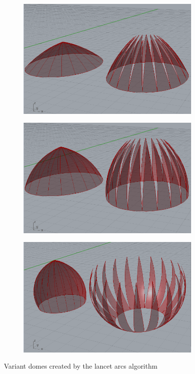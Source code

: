 \documentclass[preprint,12pt,3p]{elsarticle}
\begin{document}
\begin{figure}[h]
\begin{subfigure}{0.3\textwidth}
  \centering
  \includegraphics[width=.9\linewidth]{lancetDome01.png}
  \caption{}
  \label{fig:lancetDome01}
\end{subfigure}%
\begin{subfigure}{0.3\textwidth}
  \centering
  \includegraphics[width=.9\linewidth]{lancetDome02.png}
  \caption{}
  \label{fig:lancetDome02}
\end{subfigure}
\begin{subfigure}{0.3\textwidth}
  \centering
  \includegraphics[width=.9\linewidth]{lancetDome03.png}
  \caption{}
  \label{fig:lancetDome03}
\end{subfigure}

\caption{Variant domes created by the lancet arcs algorithm}
\label{fig:lancetdomeexamples}
\end{figure}
\end{document}
